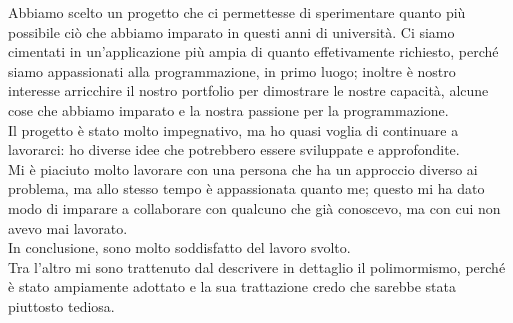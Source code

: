 \documentclass[11pt]{article}
\begin{document}
Abbiamo scelto un progetto che ci permettesse di sperimentare quanto più
possibile ciò che abbiamo imparato in questi anni di università. Ci siamo 
cimentati in un'applicazione più ampia di quanto effetivamente
richiesto, perché siamo appassionati alla programmazione, in primo luogo; 
inoltre
è nostro interesse arricchire il nostro portfolio per
dimostrare le nostre capacità, alcune cose che abbiamo imparato e la nostra
passione per la programmazione. \\
Il progetto è stato molto impegnativo, ma ho quasi voglia di continuare a
lavorarci: ho diverse idee che potrebbero essere sviluppate e approfondite.\\
Mi è piaciuto molto lavorare con una persona che ha un approccio diverso ai
problema, ma allo stesso tempo è appassionata quanto me; questo
mi ha dato modo di imparare a collaborare con qualcuno che già conoscevo, ma con 
cui non avevo mai lavorato. \\
In conclusione, sono molto soddisfatto del lavoro svolto.\\
Tra l'altro mi sono trattenuto dal descrivere in dettaglio il polimormismo, 
perché è stato ampiamente adottato e la sua trattazione credo che sarebbe stata
piuttosto tediosa.
\end{document}
